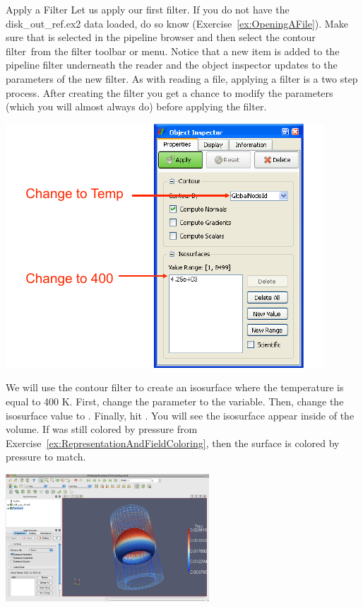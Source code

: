 \begin{exercise}{Apply a Filter}
  \label{ex:ApplyAFilter}
  Let us apply our first filter.  If you do not have the disk\_out\_ref.ex2
  data loaded, do so know (Exercise~\ref{ex:OpeningAFile}).  Make sure that
   is selected in the pipeline browser and then
  select the contour filter~\contour from the filter toolbar or
   menu.  Notice that a new item is added to the pipeline
  filter underneath the reader and the object inspector updates to the
  parameters of the new filter.  As with reading a file, applying a filter
  is a two step process.  After creating the filter you get a chance to
  modify the parameters (which you will almost always do) before applying
  the filter.

  \begin{inlinefig}
    \includegraphics{images/ContourOptions}
  \end{inlinefig}

  We will use the contour filter to create an isosurface where the
  temperature is equal to 400 K.  First, change the 
  parameter to the  variable.  Then, change the isosurface value
  to .  Finally, hit \apply.  You will see the isosurface appear
  inside of the volume.  If  was still colored by
  pressure from Exercise~\ref{ex:RepresentationAndFieldColoring}, then the
  surface is colored by pressure to match.

  \begin{inlinefig}
    \includegraphics[width=3in]{images/ContourResults}
  \end{inlinefig}
\end{exercise}

